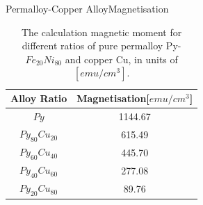 \documentclass{beamer}
\begin{document}
\begin{frame}{Permalloy-Copper Alloy}{Magnetisation}
\begin{table}[h!]
\centering
 \begin{tabular}{||c c||} 
 \hline
 Alloy Ratio & Magnetisation[$emu/cm^3$] \\ [1ex] 
 \hline\hline
 $Py$ & 1144.67 \\ 
 $Py_{80}Cu_{20}$ & 615.49 \\
 $Py_{60}Cu_{40}$ & 445.70 \\
 $Py_{40}Cu_{60}$ & 277.08 \\
 $Py_{20}Cu_{80}$ & 89.76 \\ [1ex] 
 \hline
 \end{tabular}
\caption{The calculation magnetic moment for different ratios of pure permalloy Py-$Fe_{20}Ni_{80}$ and copper Cu, in units of $[emu/cm^3]$.} 
\end{table}
\end{frame}
\end{document}
